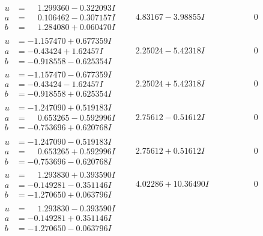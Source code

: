 \documentclass[1p]{elsarticle_modified}
\theoremstyle{definition}
\begin{document}
$$\begin{array}{c|c|c}
\begin{aligned}
u &= \phantom{-}1.299360 - 0.322093 I \\
a &= \phantom{-}0.106462 - 0.307157 I \\
b &= \phantom{-}1.284080 + 0.060470 I\end{aligned}
 & \phantom{-}4.83167 - 3.98855 I & \phantom{-0.000000 } 0 \\ \hline\begin{aligned}
u &= -1.157470 + 0.677359 I \\
a &= -0.43424 + 1.62457 I \\
b &= -0.918558 - 0.625354 I\end{aligned}
 & \phantom{-}2.25024 - 5.42318 I & \phantom{-0.000000 } 0 \\ \hline\begin{aligned}
u &= -1.157470 - 0.677359 I \\
a &= -0.43424 - 1.62457 I \\
b &= -0.918558 + 0.625354 I\end{aligned}
 & \phantom{-}2.25024 + 5.42318 I & \phantom{-0.000000 } 0 \\ \hline\begin{aligned}
u &= -1.247090 + 0.519183 I \\
a &= \phantom{-}0.653265 - 0.592996 I \\
b &= -0.753696 + 0.620768 I\end{aligned}
 & \phantom{-}2.75612 - 0.51612 I & \phantom{-0.000000 } 0 \\ \hline\begin{aligned}
u &= -1.247090 - 0.519183 I \\
a &= \phantom{-}0.653265 + 0.592996 I \\
b &= -0.753696 - 0.620768 I\end{aligned}
 & \phantom{-}2.75612 + 0.51612 I & \phantom{-0.000000 } 0 \\ \hline\begin{aligned}
u &= \phantom{-}1.293830 + 0.393590 I \\
a &= -0.149281 - 0.351146 I \\
b &= -1.270650 + 0.063796 I\end{aligned}
 & \phantom{-}4.02286 + 10.36490 I & \phantom{-0.000000 } 0 \\ \hline\begin{aligned}
u &= \phantom{-}1.293830 - 0.393590 I \\
a &= -0.149281 + 0.351146 I \\
b &= -1.270650 - 0.063796 I\end{aligned}

\end{array}$$
\end{document}

